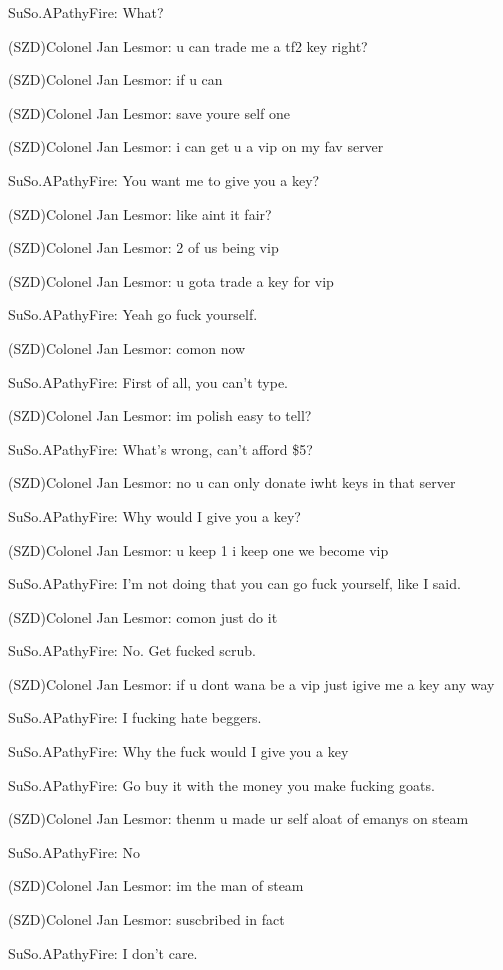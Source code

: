 \documentclass[a1paper]{article}
\begin{document}
\begin{multicols}{7}
{SuSo.APathyFire: What?

(SZD)Colonel Jan Lesmor: u can trade me a tf2 key right?

(SZD)Colonel Jan Lesmor: if u can

(SZD)Colonel Jan Lesmor: save youre self one

(SZD)Colonel Jan Lesmor: i can get u a vip on my fav server

SuSo.APathyFire: You want me to give you a key?

(SZD)Colonel Jan Lesmor: like aint it fair?

(SZD)Colonel Jan Lesmor: 2 of  us being vip

(SZD)Colonel Jan Lesmor: u gota trade a key for vip

SuSo.APathyFire: Yeah go fuck yourself.

(SZD)Colonel Jan Lesmor: comon now

SuSo.APathyFire: First of all, you can't type.

(SZD)Colonel Jan Lesmor: im polish easy to tell?

SuSo.APathyFire: What's wrong, can't afford \$5?

(SZD)Colonel Jan Lesmor: no u can only donate iwht keys in that server

SuSo.APathyFire: Why would I give you a key?

(SZD)Colonel Jan Lesmor: u keep 1 i keep one we become vip

SuSo.APathyFire: I'm not doing that you can go fuck yourself, like I said.

(SZD)Colonel Jan Lesmor: comon just do it

SuSo.APathyFire: No. Get fucked scrub.

(SZD)Colonel Jan Lesmor: if u dont wana be a vip just igive me a key any way

SuSo.APathyFire: I fucking hate beggers.

SuSo.APathyFire: Why the fuck would I give you a key

SuSo.APathyFire: Go buy it with the money you make fucking goats.

(SZD)Colonel Jan Lesmor: thenm  u made ur self aloat of emanys on steam

SuSo.APathyFire: No

(SZD)Colonel Jan Lesmor: im the man of steam

(SZD)Colonel Jan Lesmor: suscbribed in fact

SuSo.APathyFire: I don't care.
\setlength{\parskip}{0.8em}






}
\end{multicols}
\end{document}
